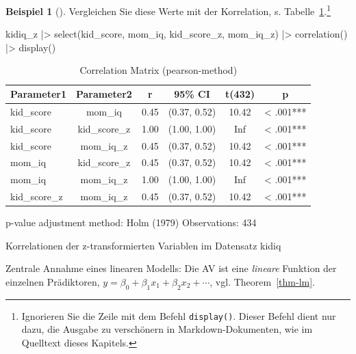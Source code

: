 \documentclass[
  ngerman,
  letterpaper,
  twoside,
  open=any]{scrbook}
\newenvironment{Shaded}{\begin{snugshade}}{\end{snugshade}}
\newcommand{\FunctionTok}[1]{\textcolor[rgb]{0.28,0.35,0.67}{#1}}
\newcommand{\NormalTok}[1]{\textcolor[rgb]{0.00,0.23,0.31}{#1}}
\newcommand{\SpecialCharTok}[1]{\textcolor[rgb]{0.37,0.37,0.37}{#1}}
\theoremstyle{definition}
\newtheorem{example}{Beispiel}[chapter]
\theoremstyle{plain}
\theoremstyle{definition}
\theoremstyle{definition}
\theoremstyle{remark}
\begin{document}
\begin{example}[]
Vergleichen Sie diese Werte mit der Korrelation, s.
Tabelle~\ref{tbl-m10.12-corr}.\footnote{Ignorieren Sie die Zeile mit dem
  Befehl \texttt{display()}. Dieser Befehl dient nur dazu, die Ausgabe
  zu verschönern in Markdown-Dokumenten, wie im Quelltext dieses
  Kapitels.}

\begin{Shaded}
\begin{Highlighting}[]
\NormalTok{kidiq\_z }\SpecialCharTok{|\textgreater{}} 
  \FunctionTok{select}\NormalTok{(kid\_score, mom\_iq, kid\_score\_z, mom\_iq\_z) }\SpecialCharTok{|\textgreater{}} 
  \FunctionTok{correlation}\NormalTok{() }\SpecialCharTok{|\textgreater{}} 
  \FunctionTok{display}\NormalTok{()}
\end{Highlighting}
\end{Shaded}

{

\begin{longtable}[]{@{}lccccc@{}}

\caption{\label{tbl-m10.12-corr}Correlation Matrix (pearson-method)}

\tabularnewline

\toprule\noalign{}
Parameter1 & Parameter2 & r & 95\% CI & t(432) & p \\
\midrule\noalign{}
\endhead
\bottomrule\noalign{}
\endlastfoot
kid\_score & mom\_iq & 0.45 & (0.37, 0.52) & 10.42 & \textless{}
.001*** \\
kid\_score & kid\_score\_z & 1.00 & (1.00, 1.00) & Inf & \textless{}
.001*** \\
kid\_score & mom\_iq\_z & 0.45 & (0.37, 0.52) & 10.42 & \textless{}
.001*** \\
mom\_iq & kid\_score\_z & 0.45 & (0.37, 0.52) & 10.42 & \textless{}
.001*** \\
mom\_iq & mom\_iq\_z & 1.00 & (1.00, 1.00) & Inf & \textless{}
.001*** \\
kid\_score\_z & mom\_iq\_z & 0.45 & (0.37, 0.52) & 10.42 & \textless{}
.001*** \\

\end{longtable}

}

p-value adjustment method: Holm (1979) Observations: 434

Korrelationen der z-transformierten Variablen im Datensatz kidiq

Zentrale Annahme eines linearen Modells: Die AV ist eine \emph{lineare}
Funktion der einzelnen Prädiktoren,
\(y= \beta_0 + \beta_1x_1 + \beta_2 x_2 + \cdots\), vgl.
Theorem~\ref{thm-lm}.


\end{example}
\end{document}
